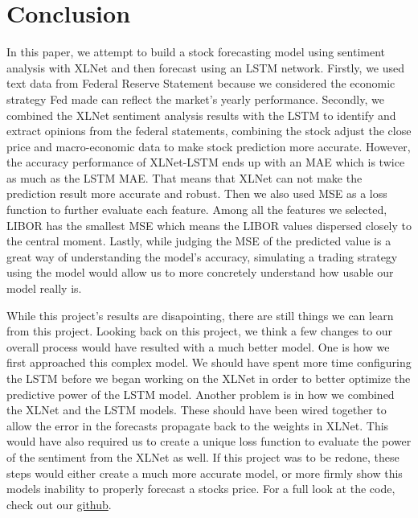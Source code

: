 \documentclass{article}
\begin{document}
\section{Conclusion}
In this paper, we attempt to build a stock forecasting model using sentiment analysis with XLNet and then forecast using an LSTM network. Firstly, we used text data from Federal Reserve Statement because we considered the economic strategy Fed made can reflect the market's yearly performance. Secondly, we combined the XLNet sentiment analysis results with the LSTM to identify and extract opinions from the federal statements, combining the stock adjust the close price and macro-economic data to make stock prediction more accurate. However, the accuracy performance of XLNet-LSTM ends up with an MAE which is twice as much as the LSTM MAE. That means that XLNet can not make the prediction result more accurate and robust. Then we also used MSE as a loss function to further evaluate each feature. Among all the features we selected, LIBOR has the smallest MSE which means the LIBOR values dispersed closely to the central moment. Lastly, while judging the MSE of the predicted value is a great way of understanding the model's accuracy, simulating a trading strategy using the model would allow us to more concretely understand how usable our model really is. \par
While this project's results are disapointing, there are still things we can learn from this project. Looking back on this project, we think a few changes to our overall process would have resulted with a much better model. One is how we first approached this complex model. We should have spent more time configuring the LSTM before we began working on the XLNet in order to better optimize the predictive power of the LSTM model. Another problem is in how we combined the XLNet and the LSTM models. These should have been wired together to allow the error in the forecasts propagate back to the weights in XLNet. This would have also required us to create a unique loss function to evaluate the power of the sentiment from the XLNet as well. If this project was to be redone, these steps would either create a much more accurate model, or more firmly show this models inability to properly forecast a stocks price. For a full look at the code, check out our \href{https://github.com/BHill96/AdvancedBigDataAnalytics}{github}.
\end{document}
